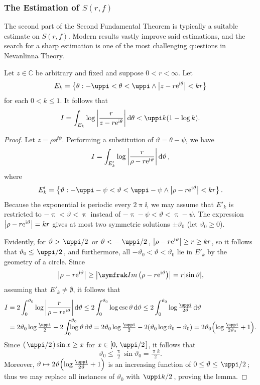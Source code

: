 \subsubsection{The Estimation of \texorpdfstring{\(S(r,f)\)}{the Small Error Term}}
The second part of the Second Fundamental Theorem is typically a suitable estimate on \(S(r,f)\).
Modern results vastly improve said estimations, and the search for a sharp estimation is one of the most challenging questions in Nevanlinna Theory.
\begin{lemma}\label{lem:nevanlinnasmallerrortermestimation1}
    Let \(z\in\mathbb{C}\) be arbitrary and fixed and suppose \(0<r<\infty\). Let \[E_k=\cbraces{\theta}{-\uppi<\theta<\uppi\wedge\abs{z-r\ee^{\ii\theta}}<kr}\] for each \(0<k\leq 1\). It follows that \[I=\int_{E_k}\log\abs{\frac{r}{z-r\ee^{\ii\theta}}}\dd{\theta}<\uppi k\qty(1-\log k).\]
\end{lemma}
\begin{proof}
    Let \(z=\rho\ee^{\ii\psi}\). Performing a substitution of \(\vartheta=\theta-\psi\), we have \[I=\int_{E'_k}\log\abs{\frac{r}{\rho-r\mathrm{e}^{\mathrm{i}\vartheta}}}\dd{\vartheta},\] where \[E'_k=\cbraces{\vartheta}{-\uppi-\psi<\vartheta<\uppi-\psi\wedge\abs{\rho-r\ee^{\ii\vartheta}}<kr}.\]
    Because the exponential is periodic every \(2\uppi\ii\), we may assume that \(E'_k\) is restricted to \(-\uppi<\vartheta<\uppi\) instead of \(-\uppi-\psi<\vartheta<\uppi-\psi\). The expression \(\abs{\rho-r\mathrm{e}^{\mathrm{i}\vartheta}}=kr\) gives at most two symmetric solutions \(\pm\vartheta_0\) (let \(\vartheta_0\geq0\)).

    Evidently, for \(\vartheta>\flatfrac{\uppi}2\) or \(\vartheta<-\flatfrac{\uppi}2\), \(\abs{\rho-r\mathrm{e}^{\mathrm{i}\vartheta}}\geq r\geq kr\), so it follows that \(\vartheta_0\leq\flatfrac{\uppi}2\), and furthermore, all \(-\vartheta_0<\vartheta<\vartheta_0\) lie in \(E'_k\) by the geometry of a circle. Since \[\abs{\rho-r\ee^{\ii\vartheta}}\geq\abs{\Im\qty(\rho-r\ee^{\ii\vartheta})}=r\abs{\sin\vartheta},\]
    assuming that \(E'_k\neq\emptyset\), it follows that
    \begin{align*}
        I&=2\int_0^{\vartheta_0}\log\abs{\frac{r}{\rho-r\ee^{\ii\vartheta}}}\dd{\vartheta}\leq2\int_0^{\vartheta_0}\log\csc\vartheta\dd{\vartheta}\leq2\int_0^{\vartheta_0}\log\tfrac{\uppi}{2\vartheta}\dd{\vartheta}\\
        &=2\vartheta_0\log\tfrac{\uppi}2-2\mathop{\mathmakebox[\widthof{\(\int\)}][l]{\int_0^{\vartheta_0}}}\log\vartheta\dd{\vartheta}=2\vartheta_0\log\tfrac{\uppi}2-2\qty(\vartheta_0\log\vartheta_0-\vartheta_0)=2\vartheta_0\qty(\log\tfrac{\uppi}{2\vartheta_0}+1).
    \end{align*}
    Since \(\qty(\flatfrac{\uppi}2)\sin x\geq x\) for \(x\in\qty[0,\flatfrac{\uppi}2]\), it follows that \[\vartheta_0\leq\tfrac{\uppi}2\sin\vartheta_0=\tfrac{\uppi k}2.\]
    Moreover, \(\vartheta\mapsto2\vartheta\qty(\log\tfrac{\uppi}{2\vartheta}+1)\) is an increasing function of \(0\leq\vartheta\leq\flatfrac{\uppi}2\); thus we may replace all instances of \(\vartheta_0\) with \(\flatfrac{\uppi k}2\), proving the lemma.
\end{proof}
